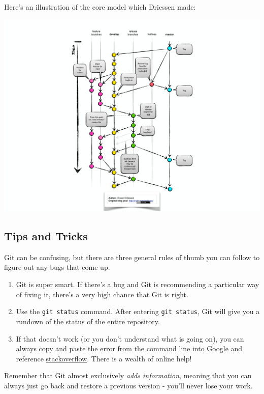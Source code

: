 \documentclass[
]{book}
\begin{document}
Here's an illustration of the core model which Driessen made:

\includegraphics{images/gitflow-model.png}

\hypertarget{tips-and-tricks-2}{%
\subsection{Tips and Tricks}\label{tips-and-tricks-2}}

Git can be confusing, but there are three general rules of thumb you can follow to figure out any bugs that come up.

\begin{enumerate}
\def\labelenumi{\arabic{enumi}.}
\item
  Git is super smart. If there's a bug and Git is recommending a particular way of fixing it, there's a very high chance that Git is right.
\item
  Use the \texttt{git\ status} command. After entering \texttt{git\ status}, Git will give you a rundown of the status of the entire repository.
\item
  If that doesn't work (or you don't understand what is going on), you can always copy and paste the error from the command line into Google and reference \href{https://stackoverflow.com/questions/tagged/git}{stackoverflow}. There is a wealth of online help!
\end{enumerate}

Remember that Git almost exclusively \emph{adds information}, meaning that you can always just go back and restore a previous version - you'll never lose your work.
\end{document}
